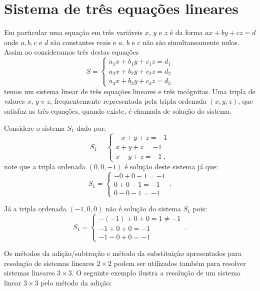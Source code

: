 \section{Sistema de três equações lineares}

\vskip0.3cm
 \colorbox{azul}{
 \begin{minipage}{14.5cm}
  Em particular uma equação em três variáveis $x$, $y$ e $z$ é da forma $ax + by + cz= d$ onde $a, b, c$ e $d$ são constantes reais e $a$, $b$ e $c$ não são simultaneamente nulos. Assim ao consideramos três destas equações
  \[S= \begin{cases}
      a_1x + b_1y + c_1z= d_1 \\
      a_2x + b_2y + c_2z= d_2 \\
      a_3x + b_3y + c_3z= d_3
     \end{cases}\]
 temos um sistema linear de três equações lineares e três incógnitas. Uma tripla de valores $x$, $y$ e $z$, frequentemente representada pela tripla ordenada $(x, y, z)$, que satisfaz as três equações, quando existe, é chamada de solução do sistema.
 \end{minipage}}
 \vskip0.3cm




\begin{exem}
 Considere o sistema $S_1$ dado por:
 \[S_1= \begin{cases}
      -x + y + z= -1 \\
      x + y + z= -1 \\
      x - y + z= -1 \ ,
     \end{cases}\]
 note que a tripla ordenada $(0, 0, -1)$ é solução deste sistema já que:
 \[S_1= \begin{cases}
      - 0 + 0 -1 = -1 \\
      0 + 0 -1 = -1\\
      0 - 0 -1 = -1
     \end{cases} \ .\]

Já a tripla ordenada $(-1, 0, 0)$ não é solução do sistema $S_1$ pois:
\[S_1= \begin{cases}
      -(-1) + 0 + 0= 1 \neq -1 \\
      -1 + 0 + 0 = -1 \\
      -1 -0 + 0 = -1
     \end{cases} \ .\]
\end{exem}

Os métodos da adição/subtração e método da substituição apresentados para resolução de sistemas lineares $2 \times 2$ podem ser utilizados também para resolver sistemas lineares $3 \times 3$. O seguinte exemplo ilustra a resolução de um sistema linear $3 \times 3$ pelo método da adição:

